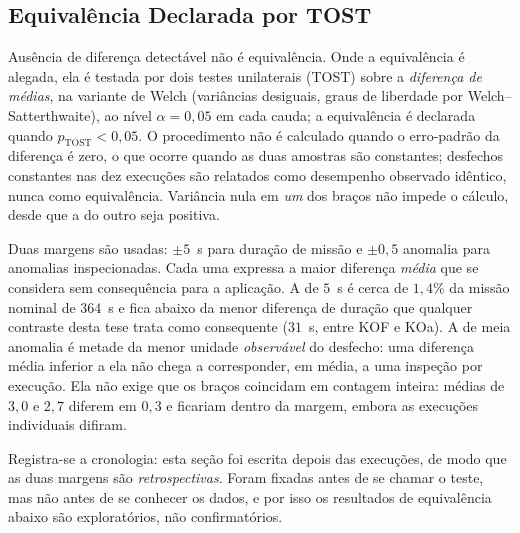 \subsection{Equivalência Declarada por TOST}
\label{sec:res-equivalencia}

Ausência de diferença detectável não é equivalência. Onde a equivalência é alegada,
ela é testada por dois testes unilaterais (TOST) sobre a \emph{diferença de médias},
na variante de Welch (variâncias desiguais, graus de liberdade por
Welch--Satterthwaite), ao nível $\alpha=0{,}05$ em cada cauda; a equivalência é
declarada quando $p_{\mathrm{TOST}}<0{,}05$. O procedimento não é calculado quando o erro-padrão da
diferença é zero, o que ocorre quando as duas amostras são constantes; desfechos
constantes nas dez execuções são relatados como desempenho observado idêntico, nunca
como equivalência. Variância nula em \emph{um} dos braços não impede o cálculo, desde
que a do outro seja positiva.

Duas margens são usadas: $\pm5$~s para duração de missão e $\pm0{,}5$ anomalia para
anomalias inspecionadas. Cada uma expressa a maior diferença \emph{média} que se
considera sem consequência para a aplicação. A de $5$~s é cerca de $1{,}4\%$ da missão
nominal de $364$~s e fica abaixo da menor diferença de duração que qualquer contraste
desta tese trata como consequente ($31$~s, entre KOF e KOa). A de meia anomalia é
metade da menor unidade \emph{observável} do desfecho: uma diferença média inferior a
ela não chega a corresponder, em média, a uma inspeção por execução. Ela não exige que
os braços coincidam em contagem inteira: médias de $3{,}0$ e $2{,}7$ diferem em
$0{,}3$ e ficariam dentro da margem, embora as execuções individuais difiram.

Registra-se a cronologia: esta seção foi escrita depois das execuções, de modo que as
duas margens são \emph{retrospectivas}. Foram fixadas antes de se chamar o teste, mas
não antes de se conhecer os dados, e por isso os resultados de equivalência abaixo são
exploratórios, não confirmatórios.

